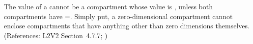 The   value of a \Compartment cannot be a
compartment whose  value is ,
unless both compartments have =.
Simply put, a zero-dimensional compartment cannot enclose
compartments that have anything other than zero dimensions
themselves.  (References: L2V2 Section~4.7.7; )
